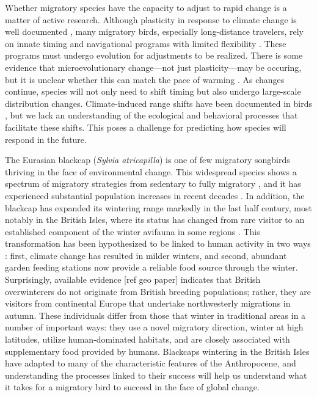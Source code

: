 \documentclass[a4paper, twoside]{templates/ociamthesis}
\begin{document}
Whether migratory species have the capacity to adjust to rapid change is a matter of active research. Although plasticity in response to climate change is well documented \autocite{gienappResponsesClimateChange2007,usuiTemporalShiftsTemperature2017}, many migratory birds, especially long-distance travelers, rely on innate timing and navigational programs with limited flexibility \autocite{akessonTimingAvianLongdistance2017,gwinnerCircannualClocksAvian1996}. These programs must undergo evolution for adjustments to be realized. There is some evidence that microevolutionary change---not just plasticity---may be occuring, but it is unclear whether this can match the pace of warming \autocite{helmEvolutionaryResponseClimate2019,vanbuskirkPhenotypicPlasticityAlone2012,charmantierClimateChangeTiming2014,merilaClimateChangeAdaptation2014}. As changes continue, species will not only need to shift timing but also undergo large-scale distribution changes. Climate-induced range shifts have been documented in birds \autocite{ambrosiniClimateChangeLongterm2011,lehikoinenNorthNorthwestClimate2016,lasortePolewardShiftsWinter2007,tingleyPushPullClimate2012}, but we lack an understanding of the ecological and behavioral processes that facilitate these shifts. This poses a challenge for predicting how species will respond in the future.

The Eurasian blackcap (\emph{Sylvia atricapilla}) is one of few migratory songbirds thriving in the face of environmental change. This widespread species shows a spectrum of migratory strategies from sedentary to fully migratory \autocite{crampSylviaAtricapillaBlackcap1992}, and it has experienced substantial population increases in recent decades \autocite{ebcc/birdlife/rspb/csoTrendsCommonBirds2018}. In addition, the blackcap has expanded its wintering range markedly in the last half century, most notably in the British Isles, where its status has changed from rare visitor to an established component of the winter avifauna in some regions \autocite{bearhopAssortativeMatingMechanism2005,bertholdMigratoryBehaviourPopulation1988,bertholdRapidMicroevolutionMigratory1992,leachWinteringBlackcapsBritain1981}. This transformation has been hypothesized to be linked to human activity in two ways \autocite{plummerSupplementaryFeedingGardens2015}: first, climate change has resulted in milder winters, and second, abundant garden feeding stations now provide a reliable food source through the winter. Surprisingly, available evidence {[}ref geo paper{]} indicates that British overwinterers do not originate from British breeding populations; rather, they are visitors from continental Europe that undertake northwesterly migrations in autumn. These individuals differ from those that winter in traditional areas in a number of important ways: they use a novel migratory direction, winter at high latitudes, utilize human-dominated habitats, and are closely associated with supplementary food provided by humans. Blackcaps wintering in the British Isles have adapted to many of the characteristic features of the Anthropocene, and understanding the processes linked to their success will help us understand what it takes for a migratory bird to succeed in the face of global change.
\end{document}
